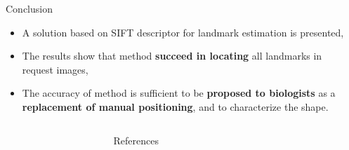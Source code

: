 \documentclass{LaBRI_poster}
\begin{document}
\begin{frame}[t]
\begin{columns}[t]
\begin{column}{\onecolwidth}
\begin{block}{Conclusion}
	\begin{itemize}
		\item A solution based on SIFT descriptor for landmark estimation is presented,
		\item The results show that method \textbf{succeed in locating} all landmarks in  request images,
		\item The accuracy of method is sufficient to be \textbf{proposed to biologists} as a \textbf{replacement of manual positioning}, and to characterize the shape.
	\end{itemize}
\end{block}
\end{column}

\begin{column}{\sepwidth}\end{column} %

\end{columns}

\begin{columns}[t] 

\begin{column}{\sepwidth}\end{column} %

\begin{column}{\onecolwidth}
\begin{block}{References}
	\hspace{2cm}
	\begin{multicols}{2}
		
		
	\end{multicols}
\end{block}

\end{column}

\begin{column}{\sepwidth}\end{column} %

\end{columns}


\end{frame}
\end{document}

